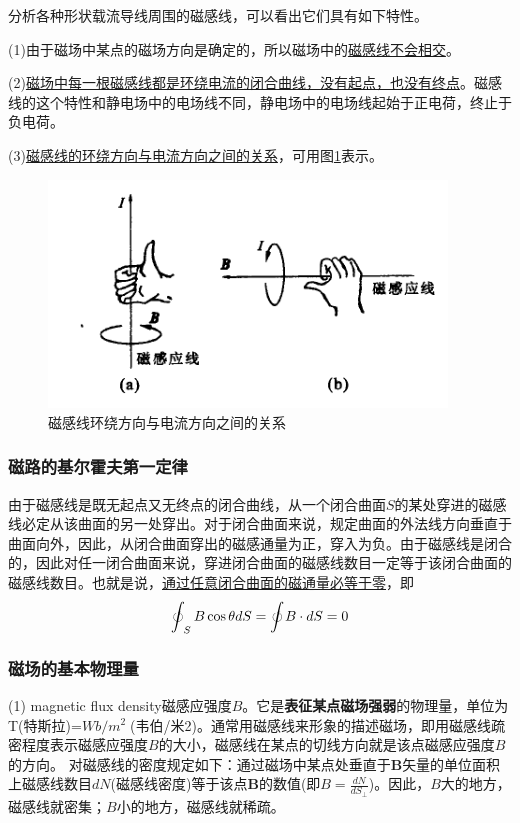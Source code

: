 \documentclass{book}
\begin{document}
分析各种形状载流导线周围的磁感线，可以看出它们具有如下特性。

(1)由于磁场中某点的磁场方向是确定的，所以磁场中的\uline{磁感线不会相交}。

(2)\uline{磁场中每一根磁感线都是环绕电流的闭合曲线，没有起点，也没有终点}。磁感线的这个特性和静电场中的电场线不同，静电场中的电场线起始于正电荷，终止于负电荷。

(3)\uline{磁感线的环绕方向与电流方向之间的关系}，可用图\ref{fig: B line1}表示。

\begin{figure}[H]
	\centering
	\includegraphics[width=25pc]{magneticfieldline}
	\caption{磁感线环绕方向与电流方向之间的关系}
	\label{fig: B line1}
\end{figure}

\subsubsection{磁路的基尔霍夫第一定律}
由于磁感线是既无起点又无终点的闭合曲线，从一个闭合曲面$S$的某处穿进的磁感线必定从该曲面的另一处穿出。对于闭合曲面来说，规定曲面的外法线方向垂直于曲面向外，因此，从闭合曲面穿出的磁感通量为正，穿入为负。由于磁感线是闭合的，因此对任一闭合曲面来说，穿进闭合曲面的磁感线数目一定等于该闭合曲面的磁感线数目。也就是说，\uline{通过任意闭合曲面的磁通量必等于零}，即
\begin{equation}
\mathop{\int\mkern-20.8mu \circlearrowleft}\nolimits_S B\cos\theta dS=\mathop{\int\mkern-20.8mu \circlearrowleft}\nolimits B\cdot dS=0	
\end{equation}

\subsubsection{磁场的基本物理量}
(1) magnetic flux density磁感应强度$B$。它是\textbf{表征某点磁场强弱}的物理量，单位为T(特斯拉)=${Wb}/{{{m}^{2}}}\;$(韦伯/米2)。通常用磁感线来形象的描述磁场，即用磁感线疏密程度表示磁感应强度$B$的大小，磁感线在某点的切线方向就是该点磁感应强度$B$的方向。
对磁感线的密度规定如下：通过磁场中某点处垂直于$\bm{B}$矢量的单位面积上磁感线数目$dN$(磁感线密度)等于该点$\bm{B}$的数值(即$B=\frac{dN}{dS_{\perp}}$)。因此，$B$大的地方，磁感线就密集；$B$小的地方，磁感线就稀疏。
\end{document}
